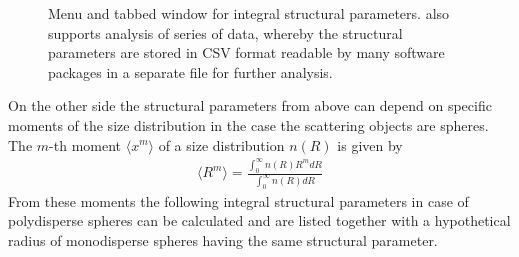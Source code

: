 \begin{figure}[htb]
\begin{center}
\hfill {}
\end{center}
\caption{Menu and tabbed window for integral structural parameters.
\SASfit also supports analysis of series of data, whereby the
structural parameters are stored in CSV format readable by many
software packages in a separate file for further analysis.}
\label{fig:QTintegralstructuralparameters}
\end{figure}


On the other side the structural parameters from above can depend on
specific moments of the size distribution in the case the scattering
objects are spheres.
 The $m$-th moment $\langle x^m\rangle$ of a size
distribution $n(R)$ is given by
\begin{align}
 \langle R^m\rangle = \frac{\displaystyle  \int_0^\infty n(R) R^m dR }{
\displaystyle \int_0^\infty n(R) dR}
\end{align}
From these moments the following integral structural parameters in
case of polydisperse spheres can be calculated and are listed
together with a hypothetical radius of monodisperse spheres having
the same structural parameter.

